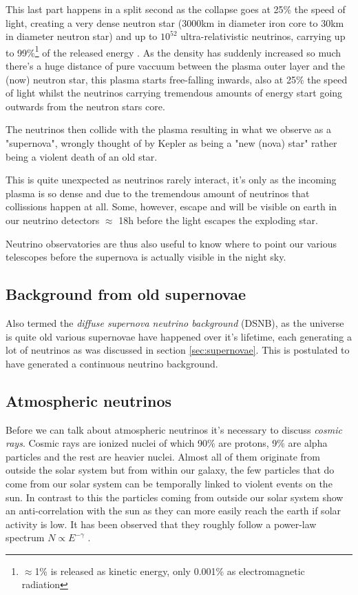 \documentclass[11pt,a4paper,faculty=we,language=en,doctype=report]{cls/ugent-doc}
\begin{document}
This last part happens in a split second as the collapse goes at 25\% the speed
of light, creating a very dense neutron star (3000km in diameter iron core to
30km in diameter neutron star) and up to $10^{52}$ ultra-relativistic
neutrinos, carrying up to 99\%\footnote{$\approx$1\% is released as kinetic energy, only 0.001\% as
electromagnetic radiation} of the released energy
\cite{Melson_2015}. As the density has suddenly increased so much
there's a huge distance of pure vaccuum between the plasma outer layer and the
(now) neutron star, this plasma starts free-falling inwards, also at 25\% the
speed of light whilst the neutrinos carrying tremendous amounts of energy start
going outwards from the neutron stars core.

The neutrinos then collide with the plasma resulting in what we observe as a
"supernova", wrongly thought of by Kepler as being a "new (nova) star" rather
being a violent death of an old star.

This is quite unexpected as neutrinos rarely interact, it's only as the
incoming plasma is so dense and due to the tremendous amount of neutrinos that
collissions happen at all. Some, however, escape and will be visible on earth
in our neutrino detectors $\approx$ 18h before the light escapes the exploding
star.

Neutrino observatories are thus also useful to know where to point our various
telescopes before the supernova is actually visible in the night sky.
\subsection{Background from old supernovae}
Also termed the \textit{diffuse supernova neutrino background} (DSNB), as the
universe is quite old various supernovae have happened over it's lifetime, each generating
a lot of neutrinos as was discussed in section \ref{sec:supernovae}. 
This is postulated to have generated a continuous neutrino background.
\subsection{Atmospheric neutrinos}
\label{sec:AtmosphericNeutrinos}
Before we can talk about atmospheric neutrinos it's necessary to discuss \textit{cosmic rays}.
Cosmic rays are ionized nuclei of which 90\% are protons, 9\% are alpha particles and
the rest are heavier nuclei. Almost all of them originate from outside the solar system but
from within our galaxy, the few particles that do come from our solar system can be temporally
linked to violent events on the sun. In contrast to this the particles coming from outside
our solar system show an anti-correlation with the sun as they can more easily reach the earth
if solar activity is low.
It has been observed that they roughly follow a power-law spectrum 
$N \propto E^{-\gamma}$ \cite{gaisser_engel_resconi_2016}.
\end{document}
